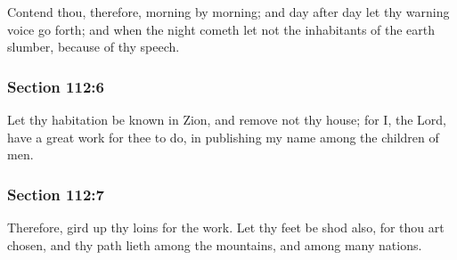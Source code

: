 		Contend thou, therefore, morning by morning; and day after day let thy warning voice go forth; and when the night cometh let not the inhabitants of the earth slumber, because of thy speech.


	\subsubsection{Section 112:6} %
		\label{DC112-6}

		Let thy habitation be known in Zion, and remove not thy house; for I, the Lord, have a great work for thee to do, in publishing my name among the children of men.


	\subsubsection{Section 112:7} %
		\label{DC112-7}

		Therefore, gird up thy loins for the work.  Let thy feet be shod also, for thou art chosen, and thy path lieth among the mountains, and among many nations.


